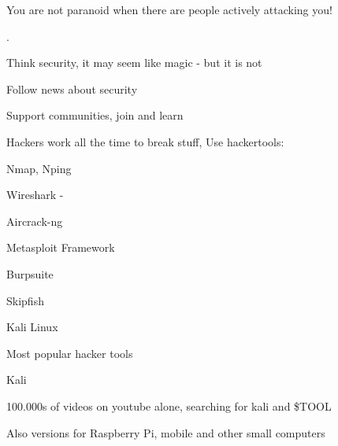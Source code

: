 \documentclass[20pt,landscape,a4paper,footrule]{foils}
\begin{document}
\vskip 1cm
\centerline{You are not paranoid when there are people actively attacking you!}





.

\begin{list1}
\item Think security, it may seem like magic - but it is not
\item Follow news about security
\item Support communities, join and learn
\end{list1}





\begin{list2}
\item Hackers work all the time to break stuff, Use hackertools:
\item Nmap, Nping 
\item Wireshark - 
\item Aircrack-ng 
\item Metasploit Framework 
\item Burpsuite 
\item Skipfish 
\item Kali Linux 
\end{list2}

\vskip 5mm
\centerline{Most popular hacker tools }



\begin{list1}
\item  Kali 
\item 100.000s of videos on youtube alone, searching for kali and \$TOOL
\item Also versions for Raspberry Pi, mobile and other small computers
\end{list1}
\end{document}
